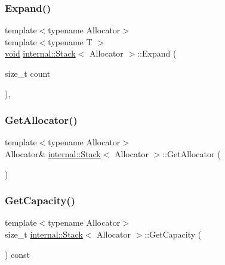 \mbox{\label{classinternal_1_1Stack_a5a530d1d2a39a05812e4fee0e299004a}} 
\subsubsection{\texorpdfstring{Expand()}{Expand()}}
{\footnotesize\ttfamily template$<$typename Allocator$>$ \\
template$<$typename T $>$ \\
\hyperlink{imgui__impl__opengl3__loader_8h_ac668e7cffd9e2e9cfee428b9b2f34fa7}{void} \hyperlink{classinternal_1_1Stack}{internal\+::\+Stack}$<$ Allocator $>$\+::Expand (\begin{DoxyParamCaption}\item[{size\+\_\+t}]{count }\end{DoxyParamCaption})\hspace{0.3cm}{\ttfamily [inline]}, {\ttfamily [private]}}

\mbox{\label{classinternal_1_1Stack_ab01f693833dfe136f574d66547623cfa}} 
\subsubsection{\texorpdfstring{Get\+Allocator()}{GetAllocator()}}
{\footnotesize\ttfamily template$<$typename Allocator$>$ \\
Allocator\& \hyperlink{classinternal_1_1Stack}{internal\+::\+Stack}$<$ Allocator $>$\+::Get\+Allocator (\begin{DoxyParamCaption}{ }\end{DoxyParamCaption})\hspace{0.3cm}{\ttfamily [inline]}}

\mbox{\label{classinternal_1_1Stack_a67d5d7ee9424d3dd46cf9d001b6cdc6b}} 
\subsubsection{\texorpdfstring{Get\+Capacity()}{GetCapacity()}}
{\footnotesize\ttfamily template$<$typename Allocator$>$ \\
size\+\_\+t \hyperlink{classinternal_1_1Stack}{internal\+::\+Stack}$<$ Allocator $>$\+::Get\+Capacity (\begin{DoxyParamCaption}{ }\end{DoxyParamCaption}) const\hspace{0.3cm}{\ttfamily [inline]}}

